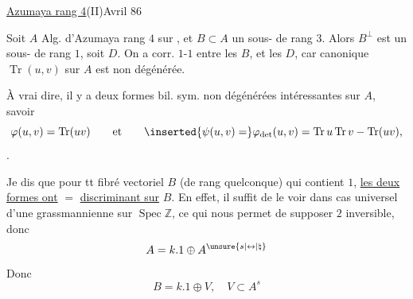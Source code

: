 \uline{Azumaya rang 4}\hfill (II)\hfill Avril 86

Soit $A$ Alg. d'Azumaya rang $4$ sur  , et $B\subset A$ un sous-  de rang $3$. Alors $B^\perp$ est un sous-  de rang $1$, soit $D$. On a corr. $1$-$1$ entre les $B$, et les $D$, car  canonique $\operatorname{Tr}(u,v)$ sur $A$ est non dégénérée.

À vrai dire, il y a deux formes bil. sym. non dégénérées intéressantes sur $A$, savoir
\[
\varphi(u,v)=\operatorname{Tr}(uv)\qquad\text{et}\qquad\inserted{\psi(u,v)=}\varphi_{\det}(u,v)=\operatorname{Tr}u\operatorname{Tr}v-\operatorname{Tr}(uv),
\]
 .

Je dis que pour tt fibré vectoriel $B$ (de rang quelconque) qui contient $1$, \uline{les deux formes ont} $=$ \uline{discriminant sur} $B$. En effet, il suffit de le voir dans cas universel d'une grassmannienne sur $\operatorname{Spec}\mathbb{Z}$, ce qui nous permet de supposer $2$ inversible, donc
\[
A=k.1\oplus A^{\unsure{s|\leftrightarrow|\natural}}
\]
Donc
\[
B=k.1\oplus V,\quad V\subset A^s
\]
